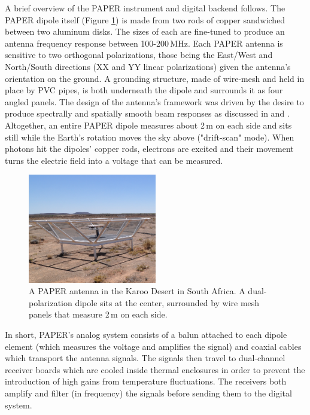 A brief overview of the PAPER instrument and digital backend follows. The PAPER dipole itself (Figure \ref{fig:paper_dipole}) is made from two rods of copper sandwiched between two aluminum disks. The sizes of each are fine-tuned to produce an antenna frequency response between 100-200\,MHz. Each PAPER antenna is sensitive to two orthogonal polarizations, those being the East/West and North/South directions (XX and YY linear polarizations) given the antenna's orientation on the ground. A grounding structure, made of wire-mesh and held in place by PVC pipes, is both underneath the dipole and surrounds it as four angled panels. The design of the antenna's framework was driven by the desire to produce spectrally and spatially smooth beam responses as discussed in \citet{parsons_et_al2010} and \citet{pober_et_al2012}. Altogether, an entire PAPER dipole measures about 2\,m on each side and sits still while the Earth's rotation moves the sky above ("drift-scan" mode). When photons hit the dipoles' copper rods, electrons are excited and their movement turns the electric field into a voltage that can be measured.

\begin{figure}
    \centering
    \includegraphics[width=0.5\textwidth]{plots/paper_dipole2.jpg}
    \caption{A PAPER antenna in the Karoo Desert in South Africa. A dual-polarization dipole sits at the center, surrounded by wire mesh panels that measure 2\,m on each side.}
    \label{fig:paper_dipole}
\end{figure}

In short, PAPER's analog system consists of a balun attached to each dipole element (which measures the voltage and amplifies the signal) and coaxial cables which transport the antenna signals. The signals then travel to dual-channel receiver boards which are cooled inside thermal enclosures in order to prevent the introduction of high gains from temperature fluctuations. The receivers both amplify and filter (in frequency) the signals before sending them to the digital system. 


